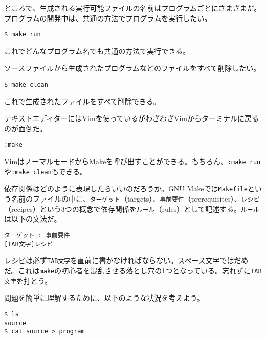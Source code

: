 ところで、生成される実行可能ファイルの名前はプログラムごとにさまざまだ。プログラムの開発中は、共通の方法でプログラムを実行したい。

\begin{lstlisting}[style=terminal]
$ make run
\end{lstlisting}

これでどんなプログラム名でも共通の方法で実行できる。

ソースファイルから生成されたプログラムなどのファイルをすべて削除したい。

\begin{lstlisting}[style=terminal]
$ make clean
\end{lstlisting}

これで生成されたファイルをすべて削除できる。

テキストエディターにはVimを使っているがわざわざVimからターミナルに戻るのが面倒だ。

\begin{lstlisting}[style=terminal]
:make
\end{lstlisting}

VimはノーマルモードからMakeを呼び出すことができる。もちろん、\texttt{:make run}や\texttt{:make clean}もできる。


依存関係はどのように表現したらいいのだろうか。GNU Makeでは\texttt{Makefile}という名前のファイルの中に、\texttt{ターゲット}（targets）、\texttt{事前要件}（prerequisites）、\texttt{レシピ}（recipes）という3つの概念で依存関係を\texttt{ルール}（rules）として記述する。\texttt{ルール}は以下の文法だ。

\begin{lstlisting}[style=grammar]
ターゲット : 事前要件
[TAB文字]レシピ
\end{lstlisting}

レシピは必ず\texttt{TAB文字}を直前に書かなければならない。スペース文字ではだめだ。これは\texttt{make}の初心者を混乱させる落とし穴の1つとなっている。忘れずに\texttt{TAB文字}を打とう。

問題を簡単に理解するために、以下のような状況を考えよう。

\begin{lstlisting}[style=terminal]
$ ls
source
$ cat source > program
\end{lstlisting}

